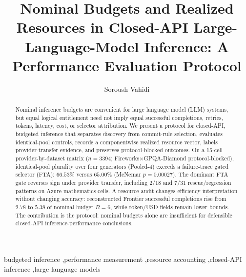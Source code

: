\title{Nominal Budgets and Realized Resources in Closed-API Large-Language-Model Inference: A Performance Evaluation Protocol}

\author[aff1]{Soroush Vahidi}


\address[aff1]{[AUTHOR CONFIRMATION REQUIRED: Department, Institution, City, Country]}

\begin{abstract}
Nominal inference budgets are convenient for large language model (LLM) systems, but equal logical
entitlement need not imply equal successful completions, retries, tokens, latency, cost, or selector
attribution. We present a protocol for closed-API, budgeted inference that separates discovery from
commit-rule selection, evaluates identical-pool controls, records a componentwise realized resource
vector, labels provider-transfer evidence, and preserves protocol-blocked outcomes. On a 15-cell
provider-by-dataset matrix ($n{=}3394$; Fireworks$\times$GPQA-Diamond protocol-blocked),
identical-pool plurality over four generators (Pooled-4) exceeds a failure-trace gated selector
(FTA): $66.53\%$ versus $65.00\%$ (McNemar $p{=}0.00027$). The dominant FTA gate reverses sign under
provider transfer, including $2/18$ and $7/31$ rescue/regression patterns on Azure mathematics
cells. A resource audit changes efficiency interpretation without changing accuracy: reconstructed
Frontier successful completions rise from $2.78$ to $5.38$ of nominal budget $B{=}6$, while token/USD
fields remain lower bounds. The contribution is the protocol: nominal budgets alone are insufficient
for defensible closed-API inference-performance conclusions.
\end{abstract}

\begin{keyword}
budgeted inference \sep performance measurement \sep resource accounting \sep closed-API inference \sep large language models
\end{keyword}
